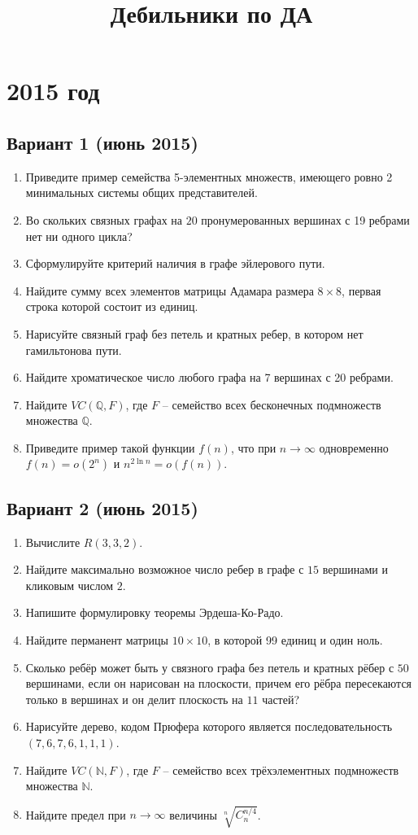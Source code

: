 \documentclass[oneside]{book}
\begin{document}
\title{Дебильники по ДА}

\maketitle

\chapter{2015 год}

\section{Вариант 1 (июнь 2015)}
\begin{enumerate}
\item Приведите пример семейства 5-элементных множеств, имеющего ровно 2 минимальных системы общих представителей.
\item Во скольких связных графах на $20$ пронумерованных вершинах с 19 ребрами нет ни одного цикла?
\item Сформулируйте критерий наличия в графе эйлерового пути.
\item Найдите сумму всех элементов матрицы Адамара размера $8 \times 8$, первая строка которой состоит из единиц.
\item Нарисуйте связный граф без петель и кратных ребер, в котором нет гамильтонова пути.
\item Найдите хроматическое число любого графа на 7 вершинах с 20 ребрами.
\item Найдите $VC(\mathbb{Q}, F)$, где $F$ -- семейство всех бесконечных подмножеств множества $\mathbb{Q}$.
\item Приведите пример такой функции $f(n)$, что при $n \rightarrow \infty$ одновременно $f(n) = o(2^n)$ и $n^{2 \ln n} = o(f(n))$.
\end{enumerate}

\section{Вариант 2 (июнь 2015)}
\begin{enumerate}
\item Вычислите $R(3, 3, 2)$.
\item Найдите максимально возможное число ребер в графе с $15$ вершинами и кликовым числом $2$.
\item Напишите формулировку теоремы Эрдеша-Ко-Радо.
\item Найдите перманент матрицы $10 \times 10$, в которой 99 единиц и один ноль.
\item Сколько ребёр может быть у связного графа без петель и кратных рёбер с $50$ вершинами, если он нарисован на плоскости, причем его рёбра пересекаются только в вершинах и он делит плоскость на $11$ частей?
\item Нарисуйте дерево, кодом Прюфера которого является последовательность $(7, 6, 7, 6, 1, 1, 1)$.
\item Найдите $VC(\mathbb{N}, F)$, где $F$ -- семейство всех трёхэлементных подмножеств множества $\mathbb{N}$.
\item Найдите предел при $n \rightarrow \infty$ величины $\sqrt[n]{C_n^{n/4}}$.
\end{enumerate}
\end{document}
